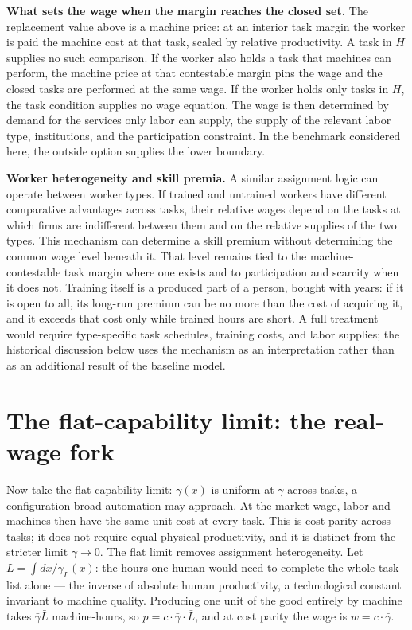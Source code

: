 \documentclass[12pt]{article}
\theoremstyle{plain}
\begin{document}
\textbf{What sets the wage when the margin reaches the closed set.}
The replacement value above is a machine price: at an interior task margin the worker
is paid the machine cost at that task, scaled by relative productivity. A
task in $H$ supplies no such comparison. If the worker also holds a task that
machines can perform, the machine price at that contestable margin pins the
wage and the closed tasks are performed at the same wage. If the worker holds
only tasks in $H$, the task condition supplies no wage equation. The wage is
then determined by demand for the services only labor can supply, the supply
of the relevant labor type, institutions, and the participation constraint.
In the benchmark considered here, the outside option supplies the lower
boundary. 

\textbf{Worker heterogeneity and skill premia.}
A similar assignment logic can operate between worker types. If trained and
untrained workers have different comparative advantages across tasks, their
relative wages depend on the tasks at which firms are indifferent between
them and on the relative supplies of the two types. This mechanism can
determine a skill premium without determining the common wage level beneath
it. That level remains tied to the machine-contestable task margin where one
exists and to participation and scarcity when it does not. Training itself is
a produced part of a person, bought with years: if it is open to all, its
long-run premium can be no more than the cost of acquiring it, and it exceeds
that cost only while trained hours are short. A full treatment would require
type-specific task schedules, training costs, and labor supplies; the
historical discussion below uses the mechanism as an interpretation rather
than as an additional result of the baseline model.

\section{The flat-capability limit: the real-wage fork}\label{sec:limit}

Now take the flat-capability limit: $\gamma(x)$ is uniform at $\bar{\gamma}$ across tasks, a configuration broad automation may approach. At the market wage, labor and machines then have the same unit cost at every task. This is cost parity across tasks; it does not require equal physical productivity, and it is distinct from the stricter limit $\bar{\gamma}\to0$. The flat limit removes assignment heterogeneity. Let $\bar{L} = \int dx/\gamma _L(x)$: the hours one human would need to complete the whole task list alone --- the inverse of absolute human productivity, a technological constant invariant to machine quality. Producing one unit of the good entirely by machine takes $\bar{\gamma}\bar{L}$ machine-hours, so $p = c\cdot \bar{\gamma}\cdot \bar{L}$, and at cost parity the wage is $w = c\cdot \bar{\gamma}$.
\end{document}
